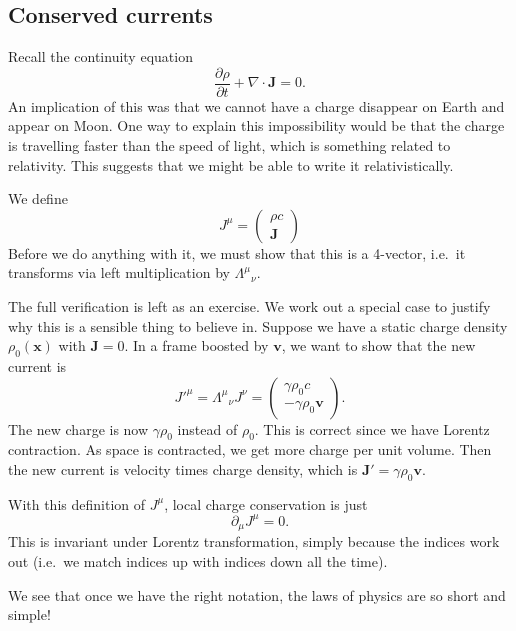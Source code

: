 \documentclass[a4paper]{article}
\begin{document}
\subsection{Conserved currents}
Recall the continuity equation
\[
  \frac{\partial\rho}{\partial t} + \nabla\cdot \mathbf{J} = 0.
\]
An implication of this was that we cannot have a charge disappear on Earth and appear on Moon. One way to explain this impossibility would be that the charge is travelling faster than the speed of light, which is something related to relativity. This suggests that we might be able to write it relativistically.

We define
\[
  J^\mu =
  \begin{pmatrix}
    \rho c\\
    \mathbf{J}
  \end{pmatrix}
\]
Before we do anything with it, we must show that this is a 4-vector, i.e.\ it transforms via left multiplication by $\Lambda^\mu\!_\nu$.

The full verification is left as an exercise. We work out a special case to justify why this is a sensible thing to believe in. Suppose we have a static charge density $\rho_0(\mathbf{x})$ with $\mathbf{J} = 0$. In a frame boosted by $\mathbf{v}$, we want to show that the new current is
\[
  J'^\mu = \Lambda^\mu\!_\nu J^\nu =
  \begin{pmatrix}
    \gamma \rho_0 c\\
    -\gamma \rho_0 \mathbf{v}
  \end{pmatrix}.
\]
The new charge is now $\gamma \rho_0$ instead of $\rho_0$. This is correct since we have Lorentz contraction. As space is contracted, we get more charge per unit volume. Then the new current is velocity times charge density, which is $\mathbf{J}' = \gamma\rho_0 \mathbf{v}$.

With this definition of $J^\mu$, local charge conservation is just
\[
  \partial_\mu J^\mu = 0.
\]
This is invariant under Lorentz transformation, simply because the indices work out (i.e.\ we match indices up with indices down all the time).

We see that once we have the right notation, the laws of physics are so short and simple!
\end{document}
